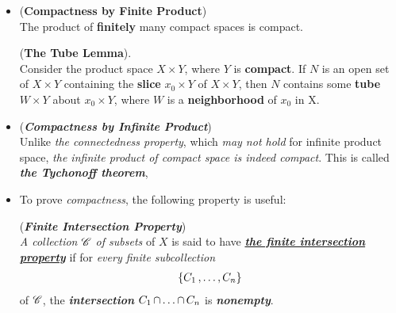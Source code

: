 \documentclass[11pt]{article}
\begin{document}
\begin{itemize}
\item \begin{proposition} (\textbf{Compactness by Finite Product}) \citep{munkres2000topology}\\
The product of \textbf{finitely} many compact spaces is compact.
\end{proposition}

\begin{lemma} (\textbf{The Tube Lemma}).\citep{munkres2000topology} \\
Consider the product space $X \times Y$, where $Y$ is \textbf{compact}. If $N$ is an open set of $X \times Y$ containing the \textbf{slice} $x_0 \times Y$ of $X \times Y$, then $N$ contains some \textbf{tube} $W \times Y$ about $x_0 \times Y$, where $W$ is a \textbf{neighborhood} of $x_0$ in X.
\end{lemma}

\item \begin{remark}(\textbf{\emph{Compactness by Infinite Product}}) \\
Unlike \emph{the connectedness property}, which \emph{may not hold} for infinite product space, \emph{the infinite product of compact space is indeed compact}. This is called \emph{\textbf{the Tychonoff theorem}},
\end{remark}



\item To prove \emph{compactness}, the following property is useful:
\begin{definition} (\emph{\textbf{Finite Intersection Property}})\\
\emph{A collection ${\mathscr C}$ of subsets} of $X$ is said to have \underline{\emph{\textbf{the finite intersection property}}} if for \emph{every finite subcollection}
\begin{align*}
\{C_1 \,{,}\ldots{,}\, C_n\}
\end{align*}
 of ${\mathscr C}$, the \emph{\textbf{intersection}} $C_1 \,{\cap}\ldots{\cap}\, C_n$ is \emph{\textbf{nonempty}}.
\end{definition}


\end{itemize}
\end{document}
